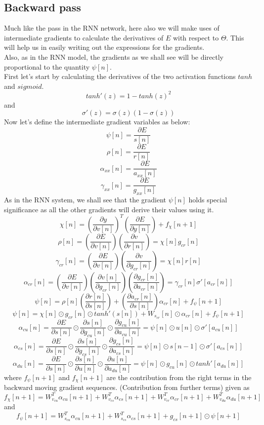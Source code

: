 \documentclass[12pt,a4paper]{article}
\begin{document}
{\subsection{Backward pass}
Much like the pass in the RNN network, here also we will make uses of intermediate gradients to calculate the derivatives of $E$ with respect to $\Theta$. This will help us in easily writing out the expressions for the gradients. 
\\
Also, as in the RNN model, the gradients as we shall see will be directly proportional to the quantity $\psi[n]$.
\\
First let's start by calculating the derivatives of the two activation functions $tanh$ and $sigmoid$.
\[
tanh'(z) = 1-tanh(z)^2\tag{47}
\]
and \[
\sigma'(z) = \sigma(z)(1-\sigma(z))\tag{48}
\]
Now let's define the intermediate gradient variables as below:
\[
\psi[n] = \frac{\partial{E}}{s[n]} \tag{49}
\]
\[
\rho[n] = \frac{\partial{E}}{r[n]} \tag{50}
\]
\[
\alpha_{xx}[n] = \frac{\partial{E}}{a_{xx}[n]} \tag{51}
\]
\[
\gamma_{xx}[n] = \frac{\partial{E}}{g_{xx}[n]}\tag{52}
\]
As in the RNN system, we shall see that the gradient $\psi[n]$ holds special significance as all the other gradients will derive their values using it.
\[
\chi[n] = (\frac{\partial{y}}{\partial{v[n]}})^{T}(\frac{\partial{E}}{\partial{y[n]}}) + f_{\chi}[n+1]\tag{53}
\]
\[
\rho[n] = (\frac{\partial{E}}{\partial{v[n]}})(\frac{\partial{v}}{\partial{r[n]}}) = \chi[n]g_{cr}[n] \tag{54}
\]
\[
\gamma_{cr}[n] = (\frac{\partial{E}}{\partial{v[n]}})(\frac{\partial{v}}{\partial{g_{cr}[n]}}) = \chi[n]r[n] \tag{55}
\]
\[
\alpha_{cr}[n] = (\frac{\partial{E}}{\partial{v[n]}})(\frac{\partial{v[n]}}{\partial{g_{cr}[n]}})(\frac{\partial{g_{cr}[n]}}{\partial{a_{cr}[n]}}) = \gamma_{cr}[n]\sigma'[a_{cr}[n]] \tag{56}
\]
\[
\psi[n] = \rho[n](\frac{\partial{r[n]}}{\partial{s[n]}}) + 
(\frac{\partial{a_{cr}[n]}}{\partial{s[n]}})\alpha_{cr}[n]
+f_{\psi}[n+1]\tag{57}
\]
\[
\psi[n] = \chi[n]\odot g_{cr}[n]\odot tanh'(s[n]) + W_{s_{cr}}[n]\odot \alpha_{cr}[n] + f_{\psi}[n+1] \tag{58}
\]
\[
\alpha_{cu}[n] = \frac{\partial{E}}{\partial{s[n]}}\odot \frac{\partial{s[n]}}{\partial{g_{cu}[n]}}\odot \frac{\partial{g_{cu}[n]}}{\partial{a_{cu}[n]}} = 
\psi[n]\odot u[n]\odot \sigma'[a_{cu}[n]] \tag{59}
\]
\[
\alpha_{cs}[n] = \frac{\partial{E}}{\partial{s[n]}}\odot \frac{\partial{s[n]}}{\partial{g_{cs}[n]}}\odot \frac{\partial{g_{cs}[n]}}{\partial{a_{cs}[n]}} = 
\psi[n]\odot s[n-1]\odot \sigma'[a_{cs}[n]] \tag{60}
\]
\[
\alpha_{du}[n] = \frac{\partial{E}}{\partial{s[n]}}\odot \frac{\partial{s[n]}}{\partial{u[n]}}\odot \frac{\partial{u[n]}}{\partial{a_{du}[n]}} = 
\psi[n]\odot g_{cu}[n]\odot tanh'[a_{du}[n]] \tag{61}
\]
where $f_{\psi}[n+1]$ and $f_{\chi}[n+1]$ are the contribution from the right terms in the backward moving gradient sequences. (Contribution from further terms) given as \\
\[
f_{\chi}[n+1] = W_{v_{cu}}^{T}\alpha_{cu}[n+1]+ W_{v_{cs}}^{T}\alpha_{cs}[n+1]+W_{v_{cr}}^{T}\alpha_{cr}[n+1]+
W_{v_{du}}^{T}\alpha_{du}[n+1]\tag{62}
\]
and
\[
f_{\psi}[n+1] = W_{s_{cu}}^{T}\alpha_{cu}[n+1]+ W_{s_{cs}}^{T}\alpha_{cs}[n+1]+g_{cs}[n+1]\odot\psi[n+1]\tag{63}
\]

}
\end{document}
